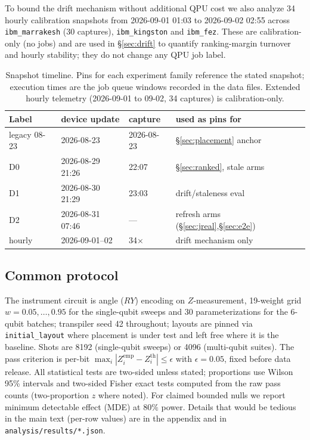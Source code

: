 \documentclass[journal,10pt,twocolumn]{IEEEtran}
\begin{document}
To bound the drift mechanism without additional QPU cost we also analyze 34 hourly calibration
snapshots from 2026-09-01 01:03 to 2026-09-02 02:55 across \texttt{ibm\_marrakesh} (30 captures),
\texttt{ibm\_kingston} and \texttt{ibm\_fez}. These are calibration-only (no jobs) and are used in
\S\ref{sec:drift} to quantify ranking-margin turnover and hourly stability; they do not change any
QPU job label.

\begin{table}[t]
\caption{Snapshot timeline. Pins for each experiment family reference the stated snapshot; execution times are the job
queue windows recorded in the data files. Extended hourly telemetry (2026-09-01 to 09-02, 34 captures) is calibration-only.}
\label{tab:snap}
\centering
\footnotesize
\setlength{\tabcolsep}{4pt}
\begin{tabular}{@{}lllp{2.9cm}@{}}
\toprule
Label & device update & capture & used as pins for\\
\midrule
legacy 08-23 & 2026-08-23 & 2026-08-23 & \S\ref{sec:placement} anchor\\
D0 & 2026-08-29 21:26 & 22:07 & \S\ref{sec:ranked}, stale arms\\
D1 & 2026-08-30 21:29 & 23:03 & drift/staleness eval\\
D2 & 2026-08-31 07:46 & --- & refresh arms (\S\ref{sec:jreal},\S\ref{sec:e2e})\\
hourly & 2026-09-01--02 & 34$\times$ & drift mechanism only\\
\bottomrule
\end{tabular}
\end{table}

\subsection{Common protocol}
The instrument circuit is angle ($RY$) encoding on $Z$-measurement, 19-weight grid $w{=}0.05,\dots,0.95$ for the
single-qubit sweeps and 30 parameterizations for the 6-qubit batches; transpiler seed 42 throughout; layouts are
pinned via \texttt{initial\_layout} where placement is under test and left free where it is the baseline. Shots are
8192 (single-qubit sweeps) or 4096 (multi-qubit suites). The pass criterion is per-bit
$\max_i|Z_i^{\mathrm{emp}}-Z_i^{\mathrm{th}}|\le\epsilon$ with $\epsilon{=}0.05$, fixed before data release. All
statistical tests are two-sided unless stated; proportions use Wilson 95\% intervals and two-sided Fisher exact
tests computed from the raw pass counts (two-proportion $z$ where noted). For claimed bounded nulls we report
minimum detectable effect (MDE) at $80\%$ power. Details that would be tedious in the main text (per-row values)
are in the appendix and in \texttt{analysis/results/*.json}.
\end{document}

